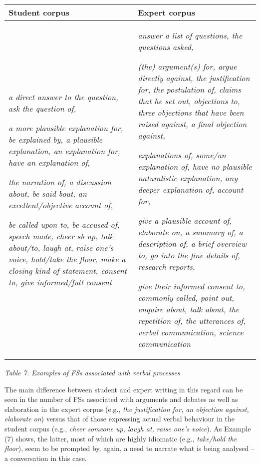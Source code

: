 \begin{center}
\tablefirsthead{}
\tablehead{}
\tabletail{}
\tablelasttail{}
\begin{supertabular}{m{2.25046in}m{2.31156in}}
\hline
Student corpus &
Expert corpus\\\hline
\textit{a direct answer to the question, ask the question of, }

\textit{a more plausible explanation for, be explained by, a plausible explanation, an explanation for, have an explanation of,}

\textit{the narration of, a discussion about, be said bout, an excellent/objective account of,}

\textit{be called upon to, be accused of, speech made, cheer sb up, talk about/to, laugh at, raise one’s voice, hold/take the floor, make a closing kind of statement, consent to, give informed/full consent} &
\textit{answer a list of questions, the questions asked, }

\textit{(the) argument(s) for, argue directly against, the justification for, the postulation of, claims that he set out, objections to, three objections that have been raised against, a final objection against, }

\textit{explanations of, some/an explanation of, have no plausible naturalistic explanation, any deeper explanation of, account for, }

\textit{give a plausible account of, elaborate on, a summary of, a description of, a brief overview to, go into the fine details of, research reports,}

\textit{give their informed consent to, commonly called, point out, enquire about, talk about, the repetition of, the utterances of, verbal communication, science communication}\\\hline
\end{supertabular}
\end{center}
\begin{styleStandard}
\textit{Table 7. Examples of FSs associated with verbal processes}
\end{styleStandard}

\begin{styleStandard}
The main difference between student and expert writing in this regard can be seen in the number of FSs associated with arguments and debates as well as elaboration in the expert corpus (e.g., \textit{the justification for, an objection against, elaborate on}) versus that of those expressing actual verbal behaviour in the student corpus (e.g., \textit{cheer someone up, laugh at, raise one’s voice}). As Example (7) shows, the latter, most of which are highly idiomatic (e.g., \textit{take/hold the floor}), seem to be prompted by, again, a need to narrate what is being analysed – a conversation in this case.
\end{styleStandard}

